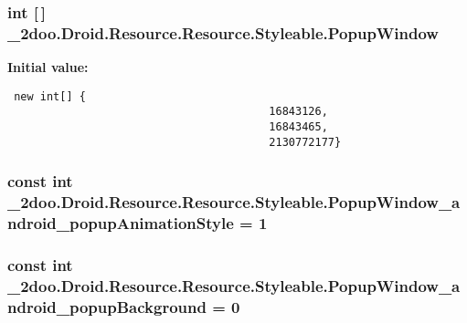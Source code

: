 \hypertarget{class__2doo_1_1_droid_1_1_resource_1_1_styleable_3bf6fefd27d82f53af4e0e6fac006ec7}{
\subsubsection[{PopupWindow}]{\setlength{\rightskip}{0pt plus 5cm}int \mbox{[}$\,$\mbox{]} \_\-2doo.Droid.Resource.Resource.Styleable.PopupWindow}}
\label{class__2doo_1_1_droid_1_1_resource_1_1_styleable_3bf6fefd27d82f53af4e0e6fac006ec7}


\textbf{Initial value:}

\begin{Code}\begin{verbatim} new int[] {
                                        16843126,
                                        16843465,
                                        2130772177}
\end{verbatim}
\end{Code}
\hypertarget{class__2doo_1_1_droid_1_1_resource_1_1_styleable_6d540fe58048121de7e1b7b07689b986}{
\subsubsection[{PopupWindow\_\-android\_\-popupAnimationStyle}]{\setlength{\rightskip}{0pt plus 5cm}const int \_\-2doo.Droid.Resource.Resource.Styleable.PopupWindow\_\-android\_\-popupAnimationStyle = 1}}
\label{class__2doo_1_1_droid_1_1_resource_1_1_styleable_6d540fe58048121de7e1b7b07689b986}


\hypertarget{class__2doo_1_1_droid_1_1_resource_1_1_styleable_634be5c3fbd38cdb92849f46e189eca7}{
\subsubsection[{PopupWindow\_\-android\_\-popupBackground}]{\setlength{\rightskip}{0pt plus 5cm}const int \_\-2doo.Droid.Resource.Resource.Styleable.PopupWindow\_\-android\_\-popupBackground = 0}}
\label{class__2doo_1_1_droid_1_1_resource_1_1_styleable_634be5c3fbd38cdb92849f46e189eca7}


